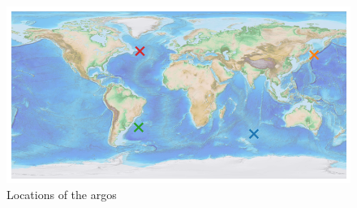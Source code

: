 \documentclass[12pt]{article}
\begin{document}
\begin{figure}[!htb]
    \centering
    \includegraphics[scale=0.7]{map_of_locations.png}
    \caption{Locations of the argos}
    \label{map}
\end{figure}
    
\end{document}
